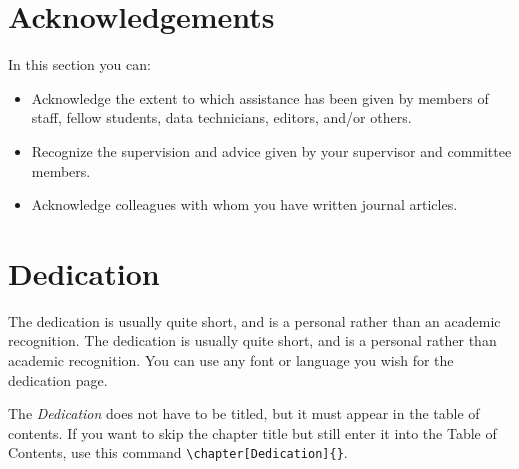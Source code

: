\documentclass[msc,oneside]{ubcthesis}%
\begin{document}
\newpage
{} \label{tableofcontent}%
\tableofcontents                %
\newpage 
{} \label{listoftab}%
\listoftables                   %
\newpage
{} \label{listoffig}%
\listoffigures                  %


\chapter{Acknowledgements}      %
In this section you can:
\begin{itemize}
    \item Acknowledge the extent to which assistance has been given by members of staff, fellow students, data technicians, editors, and/or others.
    \item Recognize the supervision and advice given by your supervisor and committee members.
    \item Acknowledge colleagues with whom you have written journal articles.
\end{itemize}

\chapter{Dedication} %
The dedication is usually quite short, and is a personal rather than
an academic recognition. The dedication is usually quite short, and is a personal rather than academic recognition. You can use any font or language you wish for the dedication page.

The \emph{Dedication} does not have to be
titled, but it must appear in the table of contents.  If you want to
skip the chapter title but still enter it into the Table of Contents,
use this command \verb|\chapter[Dedication]{}|.




\mainmatter

\end{document}
